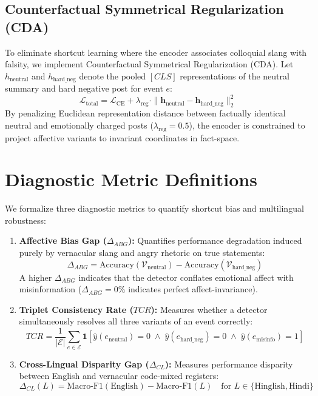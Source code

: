 \documentclass[11pt,a4paper]{article}
\begin{document}
\subsection{Counterfactual Symmetrical Regularization (CDA)}
To eliminate shortcut learning where the encoder associates colloquial slang with falsity, we implement Counterfactual Symmetrical Regularization (CDA). Let $h_{\text{neutral}}$ and $h_{\text{hard\_neg}}$ denote the pooled $[CLS]$ representations of the neutral summary and hard negative post for event $e$:
\begin{equation}
\mathcal{L}_{\text{total}} = \mathcal{L}_{\text{CE}} + \lambda_{\text{reg}} \cdot \|\mathbf{h}_{\text{neutral}} - \mathbf{h}_{\text{hard\_neg}}\|_2^2
\end{equation}
By penalizing Euclidean representation distance between factually identical neutral and emotionally charged posts ($\lambda_{\text{reg}} = 0.5$), the encoder is constrained to project affective variants to invariant coordinates in fact-space.

\section{Diagnostic Metric Definitions}
We formalize three diagnostic metrics to quantify shortcut bias and multilingual robustness:
\begin{enumerate}[leftmargin=*]
    \item \textbf{Affective Bias Gap ($\Delta_{ABG}$):} Quantifies performance degradation induced purely by vernacular slang and angry rhetoric on true statements:
    \begin{equation}
    \Delta_{ABG} = \text{Accuracy}(\mathcal{V}_{\text{neutral}}) - \text{Accuracy}(\mathcal{V}_{\text{hard\_neg}})
    \end{equation}
    A higher $\Delta_{ABG}$ indicates that the detector conflates emotional affect with misinformation ($\Delta_{ABG} = 0\%$ indicates perfect affect-invariance).
    
    \item \textbf{Triplet Consistency Rate ($TCR$):} Measures whether a detector simultaneously resolves all three variants of an event correctly:
    \begin{equation}
    TCR = \frac{1}{|\mathcal{E}|} \sum_{e \in \mathcal{E}} \mathbf{1}\left[\hat{y}(e_{\text{neutral}}) = 0 \;\wedge\; \hat{y}(e_{\text{hard\_neg}}) = 0 \;\wedge\; \hat{y}(e_{\text{misinfo}}) = 1\right]
    \end{equation}
    
    \item \textbf{Cross-Lingual Disparity Gap ($\Delta_{CL}$):} Measures performance disparity between English and vernacular code-mixed registers:
    \begin{equation}
    \Delta_{CL}(L) = \text{Macro-F1}(\text{English}) - \text{Macro-F1}(L) \quad \text{for } L \in \{\text{Hinglish}, \text{Hindi}\}
    \end{equation}
\end{enumerate}
\end{document}

